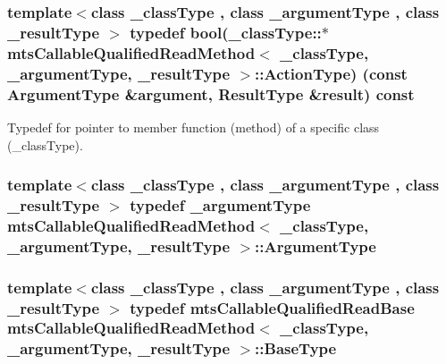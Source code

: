 \subsubsection[{Action\+Type}]{\setlength{\rightskip}{0pt plus 5cm}template$<$class \+\_\+class\+Type , class \+\_\+argument\+Type , class \+\_\+result\+Type $>$ typedef bool(\+\_\+class\+Type\+::$\ast$ {\bf mts\+Callable\+Qualified\+Read\+Method}$<$ \+\_\+class\+Type, \+\_\+argument\+Type, \+\_\+result\+Type $>$\+::Action\+Type) (const {\bf Argument\+Type} \&argument, {\bf Result\+Type} \&result) const }\label{classmts_callable_qualified_read_method_a6327de6d1017295be394178d8e03b121}
Typedef for pointer to member function (method) of a specific class (\+\_\+class\+Type). \hypertarget{classmts_callable_qualified_read_method_af34f9b3cadebbfecbd679e98c1db0e88}{}
\subsubsection[{Argument\+Type}]{\setlength{\rightskip}{0pt plus 5cm}template$<$class \+\_\+class\+Type , class \+\_\+argument\+Type , class \+\_\+result\+Type $>$ typedef \+\_\+argument\+Type {\bf mts\+Callable\+Qualified\+Read\+Method}$<$ \+\_\+class\+Type, \+\_\+argument\+Type, \+\_\+result\+Type $>$\+::{\bf Argument\+Type}}\label{classmts_callable_qualified_read_method_af34f9b3cadebbfecbd679e98c1db0e88}
\hypertarget{classmts_callable_qualified_read_method_a67c32118a2cca1e3ed70a730e6d53045}{}
\subsubsection[{Base\+Type}]{\setlength{\rightskip}{0pt plus 5cm}template$<$class \+\_\+class\+Type , class \+\_\+argument\+Type , class \+\_\+result\+Type $>$ typedef {\bf mts\+Callable\+Qualified\+Read\+Base} {\bf mts\+Callable\+Qualified\+Read\+Method}$<$ \+\_\+class\+Type, \+\_\+argument\+Type, \+\_\+result\+Type $>$\+::{\bf Base\+Type}}\label{classmts_callable_qualified_read_method_a67c32118a2cca1e3ed70a730e6d53045}
\hypertarget{classmts_callable_qualified_read_method_a6cfee5c3c3c49c691c2f5176ea79d735}{}

